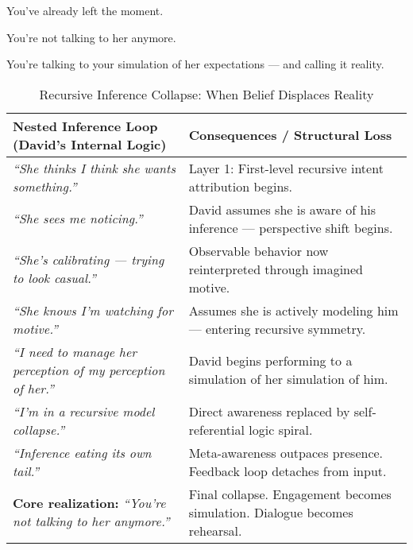 You’ve already left the moment.

You’re not talking to her anymore.

You’re talking to your simulation of her expectations — and calling it reality.

\medskip

\begin{table}[H]
  \centering
  \renewcommand{\arraystretch}{1.6}
  \begin{tabular}{>{\raggedright\arraybackslash}p{7cm} 
                  >{\raggedright\arraybackslash}p{7cm}}
  \toprule
  \textbf{Nested Inference Loop (David’s Internal Logic)} 
  & \textbf{Consequences / Structural Loss} \\
  \midrule

  \textit{“She thinks I think she wants something.”} 
  & Layer 1: First-level recursive intent attribution begins. \\
  
  \textit{“She sees me noticing.”}
  & David assumes she is aware of his inference — perspective shift begins. \\

  \textit{“She’s calibrating — trying to look casual.”} 
  & Observable behavior now reinterpreted through imagined motive. \\

  \textit{“She knows I’m watching for motive.”} 
  & Assumes she is actively modeling him — entering recursive symmetry. \\

  \textit{“I need to manage her perception of my perception of her.”} 
  & David begins performing to a simulation of her simulation of him. \\

  \textit{“I’m in a recursive model collapse.”} 
  & Direct awareness replaced by self-referential logic spiral. \\

  \textit{“Inference eating its own tail.”} 
  & Meta-awareness outpaces presence. Feedback loop detaches from input. \\

  \textbf{Core realization:} \textit{“You’re not talking to her anymore.”} 
  & Final collapse. Engagement becomes simulation. Dialogue becomes rehearsal. \\

  \bottomrule
  \end{tabular}
  \caption{Recursive Inference Collapse: When Belief Displaces Reality}
\end{table}

